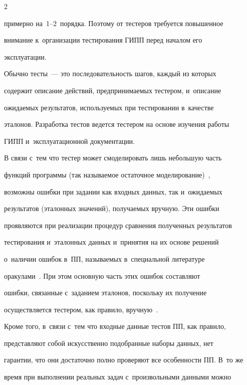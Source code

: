 \begin{multicols}{2}
\begin{itemize}
примерно на~1--2~порядка. Поэтому от тестеров требуется повышенное 


внимание к~организации тестирования ГИПП перед началом его 


эксплуатации.


    \end{itemize}


    


    Обычно тесты~--- это последовательность шагов, каждый из которых 


содержит описание действий, предпринимаемых тестером, и~описание 


ожи\-да\-емых результатов, используемых при тестировании в~качестве 


эталонов. Разработка тестов ведется тестером на основе изучения работы 


ГИПП и~эксплуатационной документации.


    


    В связи с~тем что тестер может смоделировать лишь небольшую часть 


функций программы (так называемое остаточное моделирование)~\cite{7-bf}, 


возможны ошибки при задании как входных данных, так и~ожидаемых 


результатов (эталонных значений), получаемых вручную. Эти ошибки 


проявляются при реализации процедур сравнения полученных результатов 


тестирования и~эталонных данных и~принятия на их основе решений 


о~наличии ошибок в~ПП, называемых в~специальной литературе 


оракулами~\cite{4-bf}. При этом основную часть этих ошибок составляют 


ошибки, связанные с~заданием эталонов, поскольку их получение 


осуществляется тестером, как правило, вручную~\cite{2-bf}.


    


    Кроме того, в~связи с~тем что входные данные тестов ПП, как правило, 


представляют собой искусственно подобранные наборы данных, нет 


гарантии, что они достаточно полно проверяют все особенности ПП. В~то же 


время при выполнении реальных задач с~произвольными данными можно 



\end{multicols}
